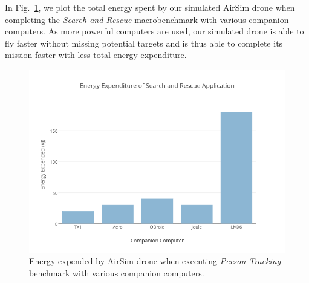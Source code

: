 In Fig.~\ref{fig:energy-search-and-rescue}, we plot the total energy spent by our simulated AirSim drone when completing the \textit{Search-and-Rescue} macrobenchmark with various companion computers. As more powerful computers are used, our simulated drone is able to fly faster without missing potential targets and is thus able to complete its mission faster with less total energy expenditure.

\begin{figure}[h]
\centering
\includegraphics[width=\linewidth]{figs/energy-search-and-rescue}
\caption{Energy expended by AirSim drone when executing \textit{Person Tracking} benchmark with various companion computers.}
\label{fig:energy-search-and-rescue}
\end{figure}
